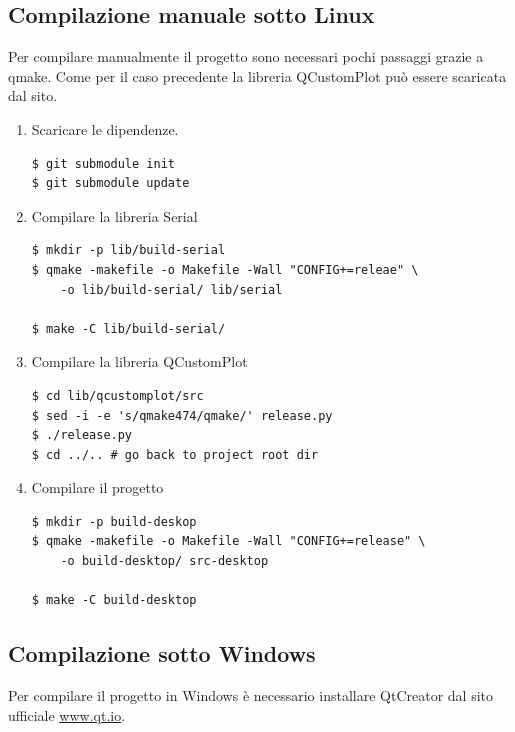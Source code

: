 \subsection{Compilazione manuale sotto Linux}
Per compilare manualmente il progetto sono necessari pochi passaggi grazie a
qmake. Come per il caso precedente la libreria QCustomPlot pu\`o essere
scaricata dal sito.

\begin{enumerate}
\item Scaricare le dipendenze.
\begin{Verbatim}[frame=single]
$ git submodule init
$ git submodule update
\end{Verbatim}

\item Compilare la libreria Serial
\begin{Verbatim}[frame=single]
$ mkdir -p lib/build-serial
$ qmake -makefile -o Makefile -Wall "CONFIG+=releae" \
    -o lib/build-serial/ lib/serial

$ make -C lib/build-serial/
\end{Verbatim}

\item Compilare la libreria QCustomPlot
\begin{Verbatim}[frame=single]
$ cd lib/qcustomplot/src
$ sed -i -e 's/qmake474/qmake/' release.py
$ ./release.py
$ cd ../.. # go back to project root dir
\end{Verbatim}

\item Compilare il progetto
\begin{Verbatim}[frame=single]
$ mkdir -p build-deskop
$ qmake -makefile -o Makefile -Wall "CONFIG+=release" \
    -o build-desktop/ src-desktop

$ make -C build-desktop
\end{Verbatim}
\end{enumerate}

\subsection{Compilazione sotto Windows}
Per compilare il progetto in Windows \`e necessario installare QtCreator dal
sito ufficiale \url{www.qt.io}.

